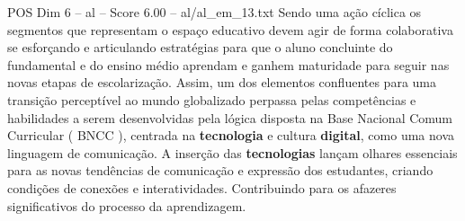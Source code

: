 \begin{textsample}{POS Dim 6 – al – Score 6.00 – al/al\_em\_13.txt}
Sendo uma ação cíclica os segmentos que representam o espaço educativo devem agir de forma colaborativa se esforçando e articulando estratégias para que o aluno concluinte do fundamental e do ensino médio aprendam e ganhem maturidade para seguir nas novas etapas de escolarização.
Assim, um dos elementos confluentes para uma transição perceptível ao mundo globalizado perpassa pelas competências e habilidades a serem desenvolvidas pela lógica disposta na Base Nacional Comum Curricular ( BNCC ), centrada na \textbf{tecnologia} e cultura \textbf{digital}, como uma nova linguagem de comunicação.
A inserção das \textbf{tecnologias} lançam olhares essenciais para as novas tendências de comunicação e expressão dos estudantes, criando condições de conexões e interatividades.
Contribuindo para os afazeres significativos do processo da aprendizagem.

\end{textsample}
